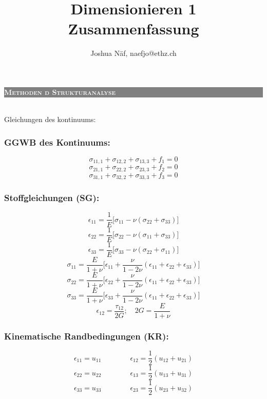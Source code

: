 \documentclass[a4paper,10pt]{article}
\title{Dimensionieren 1 Zusammenfassung\vspace{-2ex}}
\author{Joshua Näf, naefjo@ethz.ch}
\date{}
\newcommand{\uone}[2]{\colorbox{gray}{\textcolor{white}{\parbox{\linewidth-2.4}{\scshape{\medium\textbf{#1}} }}}\\}
\begin{document}
\begin{multicols}{3}

\uone{Methoden d Strukturanalyse}
    \subsection{Gleichungen des kontinuums:}
        \subsubsection{GGWB des Kontinuums:}
        \[\sigma_{11,1} + \sigma_{12,2} + \sigma_{13,3} + f_1 = 0\]
        \[\sigma_{21,1} + \sigma_{22,2} + \sigma_{23,3} + f_2 = 0\]
        \[\sigma_{31,1} + \sigma_{32,2} + \sigma_{33,3} + f_3 = 0\]
        \subsubsection{Stoffgleichungen (SG):}
        \[\epsilon_{11} = \frac{1}{E}\lbrack\sigma_{11} - \nu(\sigma_{22} + \sigma_{33})\rbrack\]
        \[\epsilon_{22} = \frac{1}{E}\lbrack\sigma_{22} - \nu(\sigma_{11} + \sigma_{33})\rbrack\]
        \[\epsilon_{33} = \frac{1}{E}\lbrack\sigma_{33} - \nu(\sigma_{22} + \sigma_{11})\rbrack\]
        \[\sigma_{11}=\frac{E}{1+\nu}\lbrack\epsilon_{11}+\frac{\nu}{1-2\nu}(\epsilon_{11}+\epsilon_{22}+\epsilon_{33})\rbrack\]
        \[\sigma_{22}=\frac{E}{1+\nu}\lbrack\epsilon_{22}+\frac{\nu}{1-2\nu}(\epsilon_{11}+\epsilon_{22}+\epsilon_{33})\rbrack\]
        \[\sigma_{33}=\frac{E}{1+\nu}\lbrack\epsilon_{33}+\frac{\nu}{1-2\nu}(\epsilon_{11}+\epsilon_{22}+\epsilon_{33})\rbrack\]
        \[\epsilon_{12}=\frac{\tau_{12}}{2G}; \quad 2G=\frac{E}{1+\nu}\]
        \subsubsection{Kinematische Randbedingungen (KR):}
        \[\epsilon_{11} = u_{11}\quad\quad\quad\quad\epsilon_{12} = \frac{1}{2}(u_{12} + u_{21})\]
        \[\epsilon_{22} = u_{22}\quad\quad\quad\quad\epsilon_{13} = \frac{1}{2}(u_{13} + u_{31})\]
        \[\epsilon_{33} = u_{33}\quad\quad\quad\quad\epsilon_{23} = \frac{1}{2}(u_{23} + u_{32})\]
        

\end{multicols}
\end{document}
